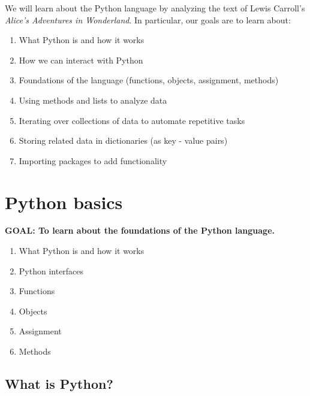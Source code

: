 \documentclass[
]{book}
\providecommand{\tightlist}{%
  \setlength{\itemsep}{0pt}\setlength{\parskip}{0pt}}
\begin{document}
\begin{alert}

We will learn about the Python language by analyzing the text of Lewis Carroll's \emph{Alice's Adventures in Wonderland}.
In particular, our goals are to learn about:

\begin{enumerate}
\def\labelenumi{\arabic{enumi}.}
\tightlist
\item
  What Python is and how it works
\item
  How we can interact with Python
\item
  Foundations of the language (functions, objects, assignment, methods)
\item
  Using methods and lists to analyze data
\item
  Iterating over collections of data to automate repetitive tasks
\item
  Storing related data in dictionaries (as key - value pairs)
\item
  Importing packages to add functionality
\end{enumerate}

\end{alert}

\hypertarget{python-basics}{%
\section{Python basics}\label{python-basics}}

\begin{alert}

\textbf{GOAL: To learn about the foundations of the Python language.}

\begin{enumerate}
\def\labelenumi{\arabic{enumi}.}
\tightlist
\item
  What Python is and how it works
\item
  Python interfaces
\item
  Functions
\item
  Objects
\item
  Assignment
\item
  Methods
\end{enumerate}

\end{alert}

\hypertarget{what-is-python}{%
\subsection{What is Python?}\label{what-is-python}}
\end{document}
